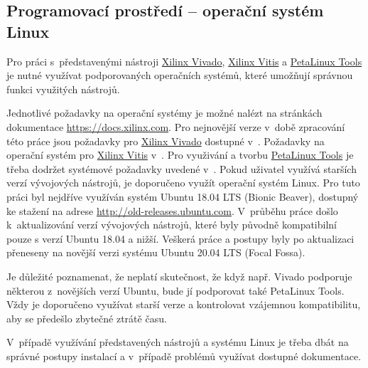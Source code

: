 \documentclass[a4paper, twoside, 11pt]{article}
\begin{document}
		\subsection{Programovací prostředí – operační systém Linux}
			Pro práci s~představenými nástroji \hyperref[subsec:xilinx-vivado]{Xilinx Vivado}, \hyperref[subsec:xilinx-vitis]{Xilinx Vitis} a \hyperref[subsec:petalinux-tools]{PetaLinux Tools} je nutné využívat podporovaných operačních systémů, které umožňují správnou funkci využitých nástrojů.\par
			Jednotlivé požadavky na operační systémy je možné nalézt na stránkách dokumentace \href{https://docs.xilinx.com}{\textcolor{ctublue}{https://docs.xilinx.com}}. Pro nejnovější verze v~době zpracování této práce jsou požadavky pro \hyperref[subsec:xilinx-vivado]{Xilinx Vivado} dostupné v~\cite{xilinx-vivado-design-suite-user-guide-2022}. Požadavky na operační systém pro \hyperref[subsec:xilinx-vitis]{Xilinx Vitis} v~\cite{vitis-unified-software-platform-documentation-2022}. Pro využivání a tvorbu \hyperref[subsec:petalinux-tools]{PetaLinux Tools} je třeba dodržet systémové požadavky uvedené v~\cite{petalinux-tools-documentation-2022}.
			Pokud uživatel využívá starších verzí vývojových nástrojů, je doporučeno využít operační systém Linux. Pro tuto práci byl nejdříve využíván systém Ubuntu 18.04 LTS (Bionic Beaver), dostupný ke stažení na adrese \href{http://old-releases.ubuntu.com}{\textcolor{ctublue}{http://old-releases.ubuntu.com}}. V~průběhu práce došlo k~aktualizování verzí vývojových nástrojů, které byly původně kompatibilní pouze s verzí Ubuntu 18.04 a nižší. Veškerá práce a postupy byly po aktualizaci přeneseny na novější verzi systému Ubuntu 20.04 LTS (Focal Fossa).\par
			Je důležité poznamenat, že neplatí skutečnost, že když např. Vivado podporuje některou z~novějších verzí Ubuntu, bude jí podporovat také PetaLinux Tools. Vždy je doporučeno využívat starší verze a kontrolovat vzájemnou kompatibilitu, aby se předešlo zbytečné ztrátě času.\par
			V~případě využívání představených nástrojů a systému Linux je třeba dbát na správné postupy instalací a v~případě problémů využívat dostupné dokumentace.
\end{document}
